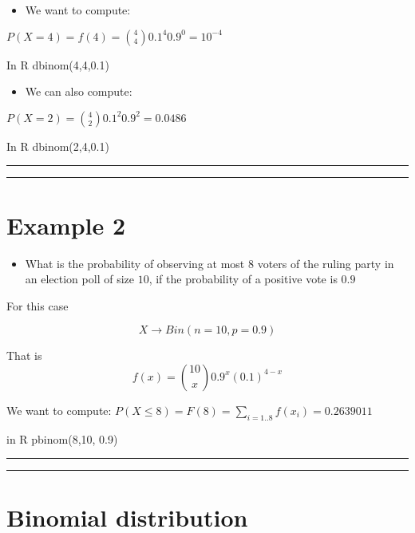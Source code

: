 \documentclass[
]{book}
\providecommand{\tightlist}{%
  \setlength{\itemsep}{0pt}\setlength{\parskip}{0pt}}
\begin{document}
\begin{itemize}
\tightlist
\item
  We want to compute:
\end{itemize}

\(P(X=4)=f(4)=\binom 4 4 0.1^4 0.9^{0}=10^{-4}\)

In R dbinom(4,4,0.1)

\begin{itemize}
\tightlist
\item
  We can also compute:
\end{itemize}

\(P(X=2)=\binom 4 2 0.1^2 0.9^2=0.0486\)

In R dbinom(2,4,0.1)

\begin{center}\rule{0.5\linewidth}{0.5pt}\end{center}

\begin{center}\rule{0.5\linewidth}{0.5pt}\end{center}

\hypertarget{example-2-1}{%
\section{Example 2}\label{example-2-1}}

\begin{itemize}
\tightlist
\item
  What is the probability of observing at most \(8\) voters of the ruling party in an election poll of size \(10\), if the probability of a positive vote is \(0.9\)
\end{itemize}

For this case

\[X \rightarrow Bin(n=10, p=0.9)\]

That is \[f(x)=\binom {10} x 0.9^x(0.1)^{4-x}\]

We want to compute:
\(P(X\le 8)=F(8)= \sum_{i=1..8} f(x_i)=0.2639011\)

in R pbinom(8,10, 0.9)

\begin{center}\rule{0.5\linewidth}{0.5pt}\end{center}

\begin{center}\rule{0.5\linewidth}{0.5pt}\end{center}

\hypertarget{binomial-distribution-3}{%
\section{Binomial distribution}\label{binomial-distribution-3}}
\end{document}
